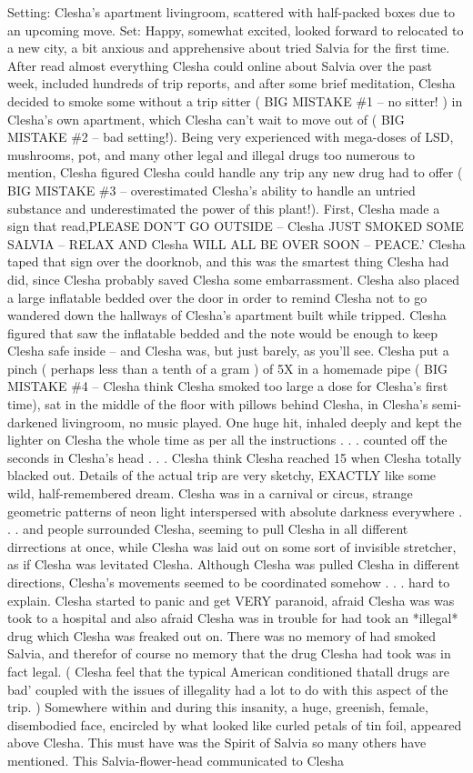 \documentclass[12pt]{book}
\begin{document}
Setting: Clesha's apartment livingroom, scattered with half-packed boxes due to an upcoming move. Set: Happy, somewhat excited, looked forward to relocated to a new city, a bit anxious and apprehensive about tried Salvia for the first time. After read almost everything Clesha could online about Salvia over the past week, included hundreds of trip reports, and after some brief meditation, Clesha decided to smoke some without a trip sitter ( BIG MISTAKE \#1 -- no sitter! ) in Clesha's own apartment, which Clesha can't wait to move out of ( BIG MISTAKE \#2 -- bad setting!). Being very experienced with mega-doses of LSD, mushrooms, pot, and many other legal and illegal drugs too numerous to mention, Clesha figured Clesha could handle any trip any new drug had to offer ( BIG MISTAKE \#3 -- overestimated Clesha's ability to handle an untried substance and underestimated the power of this plant!). First, Clesha made a sign that read,PLEASE DON'T GO OUTSIDE -- Clesha JUST SMOKED SOME SALVIA -- RELAX AND Clesha WILL ALL BE OVER SOON -- PEACE.' Clesha taped that sign over the doorknob, and this was the smartest thing Clesha had did, since Clesha probably saved Clesha some embarrassment. Clesha also placed a large inflatable bedded over the door in order to remind Clesha not to go wandered down the hallways of Clesha's apartment built while tripped. Clesha figured that saw the inflatable bedded and the note would be enough to keep Clesha safe inside -- and Clesha was, but just barely, as you'll see. Clesha put a pinch ( perhaps less than a tenth of a gram ) of 5X in a homemade pipe ( BIG MISTAKE \#4 -- Clesha think Clesha smoked too large a dose for Clesha's first time), sat in the middle of the floor with pillows behind Clesha, in Clesha's semi-darkened livingroom, no music played. One huge hit, inhaled deeply and kept the lighter on Clesha the whole time as per all the instructions  . . .  counted off the seconds in Clesha's head  . . .  Clesha think Clesha reached 15 when Clesha totally blacked out. Details of the actual trip are very sketchy, EXACTLY like some wild, half-remembered dream. Clesha was in a carnival or circus, strange geometric patterns of neon light interspersed with absolute darkness everywhere  . . .  and people surrounded Clesha, seeming to pull Clesha in all different dirrections at once, while Clesha was laid out on some sort of invisible stretcher, as if Clesha was levitated Clesha. Although Clesha was pulled Clesha in different directions, Clesha's movements seemed to be coordinated somehow  . . .  hard to explain. Clesha started to panic and get VERY paranoid, afraid Clesha was was took to a hospital and also afraid Clesha was in trouble for had took an *illegal* drug which Clesha was freaked out on. There was no memory of had smoked Salvia, and therefor of course no memory that the drug Clesha had took was in fact legal. ( Clesha feel that the typical American conditioned thatall drugs are bad' coupled with the issues of illegality had a lot to do with this aspect of the trip. ) Somewhere within and during this insanity, a huge, greenish, female, disembodied face, encircled by what looked like curled petals of tin foil, appeared above Clesha. This must have was the Spirit of Salvia so many others have mentioned. This Salvia-flower-head communicated to Clesha 
\end{document}
